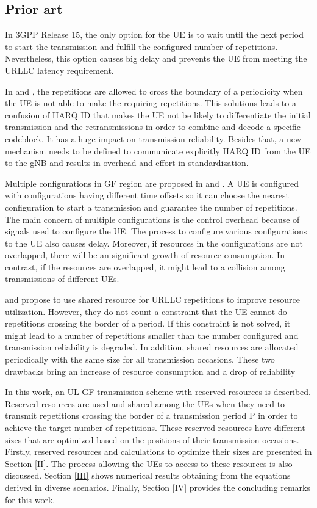 \documentclass[conference]{IEEEtran}
\begin{document}
\subsection{Prior art}\label{ICC}
In 3GPP Release 15, the only option for the UE is to wait until the next period to start the transmission and fulfill the configured number of repetitions. Nevertheless, this option causes big delay and prevents the UE from meeting the URLLC latency requirement. 

In \cite{b1} and \cite{b2}, the repetitions are allowed to cross the boundary of a periodicity when the UE is not able to make the requiring repetitions. This solutions leads to a confusion of HARQ ID that makes the UE not be likely to differentiate the initial transmission and the retransmissions in order to combine and decode a specific codeblock. It has a huge impact on transmission reliability. Besides that, a new mechanism needs to be defined to communicate explicitly HARQ ID from the UE to the gNB and results in overhead and effort in standardization.  

Multiple configurations in GF region are proposed in \cite{b3} and \cite{b4}. A UE is configured with configurations having different time offsets so it can choose the nearest configuration to start a transmission and guarantee the number of repetitions. The main concern of multiple configurations is the control overhead because of signals used to configure the UE. The process to configure various configurations to the UE also causes delay. Moreover, if resources in the configurations are not overlapped, there will be an significant growth of resource consumption. In contrast, if the resources are overlapped, it might lead to a collision among transmissions of different UEs.

\cite{b5} and \cite{b7} propose to use shared resource for URLLC repetitions to improve resource utilization. However, they do not count a constraint that the UE cannot do repetitions crossing the border of a period. If this constraint is not solved, it might lead to a number of repetitions smaller than the  number configured and transmission reliability is degraded. In addition, shared resources are allocated periodically with the same size for all transmission occasions. These two drawbacks bring an increase of resource consumption and a drop of reliability 

In this work, an UL GF transmission scheme with reserved resources is described. Reserved resources are used and shared among the UEs when they need to transmit repetitions crossing the border of a transmission period P in order to achieve the target number of repetitions. These reserved resources have different sizes that are optimized based on the positions of their transmission occasions.  
Firstly, reserved resources and calculations to optimize their sizes are presented in Section \ref{II}. The process allowing the UEs to access to these resources is also discussed. Section \ref{III} shows numerical results obtaining from the equations derived in diverse scenarios. Finally, Section \ref{IV} provides the concluding remarks for this work.
\end{document}
